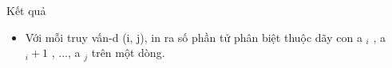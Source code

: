 Kết quả
\begin{itemize}
	\item     Với mỗi truy vấn-d (i, j), in ra số phần tử phân biệt thuộc   dãy con a    $_     i    $    , a    $_     i+1    $    , ...,   a    $_     j    $    trên một dòng.    


\end{itemize}